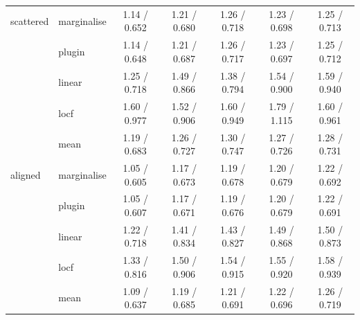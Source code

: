 \begin{table}[htbp]
\begin{tabular}{llccccc}
    \addlinespace
    scattered & marginalise & 1.14 / 0.652 & 1.21 / 0.680 & 1.26 / 0.718 & 1.23 / 0.698 & 1.25 / 0.713 \\
     & plugin & 1.14 / 0.648 & 1.21 / 0.687 & 1.26 / 0.717 & 1.23 / 0.697 & 1.25 / 0.712 \\
     & linear & 1.25 / 0.718 & 1.49 / 0.866 & 1.38 / 0.794 & 1.54 / 0.900 & 1.59 / 0.940 \\
     & locf & 1.60 / 0.977 & 1.52 / 0.906 & 1.60 / 0.949 & 1.79 / 1.115 & 1.60 / 0.961 \\
     & mean & 1.19 / 0.683 & 1.26 / 0.727 & 1.30 / 0.747 & 1.27 / 0.726 & 1.28 / 0.731 \\
    \addlinespace
    aligned & marginalise & 1.05 / 0.605 & 1.17 / 0.673 & 1.19 / 0.678 & 1.20 / 0.679 & 1.22 / 0.692 \\
     & plugin & 1.05 / 0.607 & 1.17 / 0.671 & 1.19 / 0.676 & 1.20 / 0.679 & 1.22 / 0.691 \\
     & linear & 1.22 / 0.718 & 1.41 / 0.834 & 1.43 / 0.827 & 1.49 / 0.868 & 1.50 / 0.873 \\
     & locf & 1.33 / 0.816 & 1.50 / 0.906 & 1.54 / 0.915 & 1.55 / 0.920 & 1.58 / 0.939 \\
     & mean & 1.09 / 0.637 & 1.19 / 0.685 & 1.21 / 0.691 & 1.22 / 0.696 & 1.26 / 0.719 \\
    \bottomrule
  \end{tabular}
\end{table}
